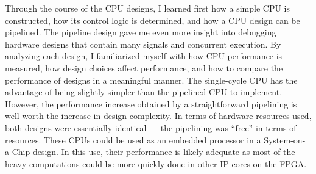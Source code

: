 \documentclass[12pt]{article}
\begin{document}
Through the course of the CPU designs, I learned first how a simple CPU is constructed, how its control logic is determined, and how a CPU design can be pipelined. The pipeline design gave me even more insight into debugging hardware designs that contain many signals and concurrent execution. By analyzing each design, I familiarized myself with how CPU performance is measured, how design choices affect performance, and how to compare the performance of designs in a meaningful manner. The single-cycle CPU has the advantage of being slightly simpler than the pipelined CPU to implement. However, the performance increase obtained by a straightforward pipelining is well worth the increase in design complexity. In terms of hardware resources used, both designs were essentially identical --- the pipelining was ``free'' in terms of resources. These CPUs could be used as an embedded processor in a System-on-a-Chip design. In this use, their performance is likely adequate as most of the heavy computations could be more quickly done in other IP-cores on the FPGA.\\
\end{document}
